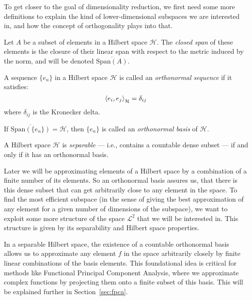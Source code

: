 To get closer to the goal of dimensionality reduction, we first need some more definitions
to explain the kind of lower-dimensional subspaces we are interested in, and how the
concept of orthogonality plays into that.
\begin{definition}
    \label{def:closed span}
    Let \( A \) be a subset of elements in a Hilbert
    space \( \mathcal{H} \). The \textit{closed span} of these
    elements is the closure of their linear span with respect to the metric induced by the
    norm, and will be denoted $\overline{\text{Span}(A)}$.
\end{definition}
\begin{definition}
    \label{def:orthonormal sequence}
    A sequence \( \{ e_n \} \) in a Hilbert space \( \mathcal{H} \) is called an
    \textit{orthonormal sequence} if it satisfies:
    \[
    \left \langle e_i, e_j \right \rangle_\mathcal{H} = \delta_{ij}
    \]
    where \( \delta_{ij} \) is the Kronecker delta.

    If $\overline{\text{Span}(\{ e_n \})} =  \mathcal{H}$, then $\{ e_n \}$ is called an
    \textit{orthonormal basis} of $\mathcal{H}$.
\end{definition}
\begin{theorem}
    \label{thm:separability-orthonormal-basis}
    A Hilbert space \( \mathcal{H} \) is \textit{separable} --- i.e., contains a countable dense
    subset --- if and only if it has an orthonormal basis.
\end{theorem}
Later we will be approximating elements of a Hilbert space by a combination of a finite
number of its elements. So an orthonormal basis assures us, that there is this dense
subset that can get arbitrarily close to any element in the space. To find the most
efficient subspace (in the sense of giving the best approximation of any element for a
given number of dimensions of the subspace), we want to exploit some more structure of
the space $\mathcal{L}^2$ that we will be interested in. This structure
is given by its separability and Hilbert space properties.

In a separable Hilbert space, the existence of a countable orthonormal basis allows us to
approximate any element \( f \) in the space arbitrarily closely by finite linear combinations
of the basis elements. This foundational idea is critical for methods like Functional Principal
Component Analysis, where we approximate complex functions by projecting them onto a finite
subset of this basis. This will be explained further in Section~\ref{sec:fpca}.

